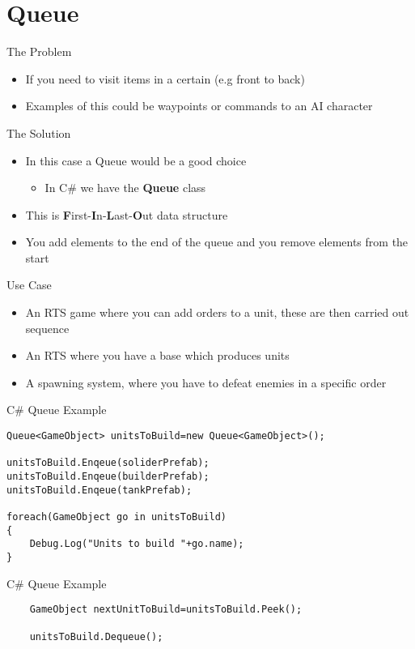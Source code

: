 \part{Queue}
\frame{\partpage}

\begin{frame}{The Problem}
	\begin{itemize}
		\pause \item If you need to visit items in a certain (e.g front to back)
		\pause \item Examples of this could be waypoints or commands to an AI character 
	\end{itemize}
\end{frame}

\begin{frame}{The Solution}
	\begin{itemize}
		\pause \item In this case a Queue would be a good choice
		\begin{itemize}
			\pause \item In C\# we have the \textbf{Queue} class
		\end{itemize}
		\pause \item This is \textbf{F}irst-\textbf{I}n-\textbf{L}ast-\textbf{O}ut data structure
		\pause \item You add elements to the end of the queue and you remove elements from the start
	\end{itemize}
\end{frame}

\begin{frame}{Use Case}
	\begin{itemize}
		\pause \item An RTS game where you can add orders to a unit, these are then carried out sequence
		\pause \item An RTS where you have a base which produces units
		\pause \item A spawning system, where you have to defeat enemies in a specific order
	\end{itemize}
\end{frame}

\begin{frame}[fragile]{C\# Queue
Example}
\begin{lstlisting}
Queue<GameObject> unitsToBuild=new Queue<GameObject>();

unitsToBuild.Enqeue(soliderPrefab);
unitsToBuild.Enqeue(builderPrefab);
unitsToBuild.Enqeue(tankPrefab);

foreach(GameObject go in unitsToBuild)
{
	Debug.Log("Units to build "+go.name);
}

\end{lstlisting}
\end{frame}


\begin{frame}[fragile]{C\# Queue
	Example}
\begin{lstlisting}
	GameObject nextUnitToBuild=unitsToBuild.Peek();
	
	unitsToBuild.Dequeue();
\end{lstlisting}
\end{frame}
